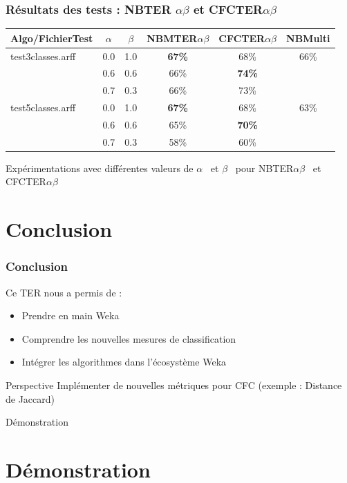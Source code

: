 \documentclass[12pt]{beamer}
\begin{document}
\begin{frame}
\frametitle{Résultats des tests : NBTER $\alpha\beta$ et CFCTER$\alpha\beta$ }
\begin{footnotesize}



\begin{table}


    \begin{tabular}{|l|c|c|c|c||c|}
\hline
 Algo/FichierTest & $\alpha$ & $\beta$ & NBMTER$\alpha\beta$ & CFCTER$\alpha\beta$ & NBMulti \\
    \hline
    test3classes.arff &  0.0 &  1.0& \textbf{67\%} & 68\% & 66\% \\
    \cline{2-5}
         ~ &   0.6  &  0.6 & 66\% & \textbf{74\%} & ~\\
         \cline{2-5}
         ~ &   0.7  &  0.3 & 66\% & 73\% & ~\\
    \hline
     test5classes.arff &  0.0 &  1.0& \textbf{67\%} &68\% & 63\% \\
    \cline{2-5}
         ~ &   0.6  &  0.6 & 65\% & \textbf{70\%} & ~\\
         \cline{2-5}
         ~ &   0.7  &  0.3 & 58\% & 60\% & ~\\
    \hline
    \end{tabular}
\end{table}
\end{footnotesize}
\medskip
Expérimentations avec différentes valeurs de $\alpha$  \ et $\beta$ \  pour NBTER$\alpha\beta$ \ et CFCTER$\alpha\beta$ 
\end{frame}



\section{Conclusion}
\begin{frame}
\frametitle{Conclusion}
Ce TER nous a permis de :
\begin{itemize}
\item Prendre en main  Weka 
\item Comprendre les nouvelles mesures de classification
\item Intégrer les algorithmes dans l’écosystème Weka 
\end{itemize}
\begin{block}{Perspective}
Implémenter de nouvelles métriques pour CFC (exemple : Distance de Jaccard)
\end{block}

\end{frame}
\begin{frame}

\begin{center}
\huge Démonstration

\end{center}
\end{frame}
\section{Démonstration}
\end{document}
